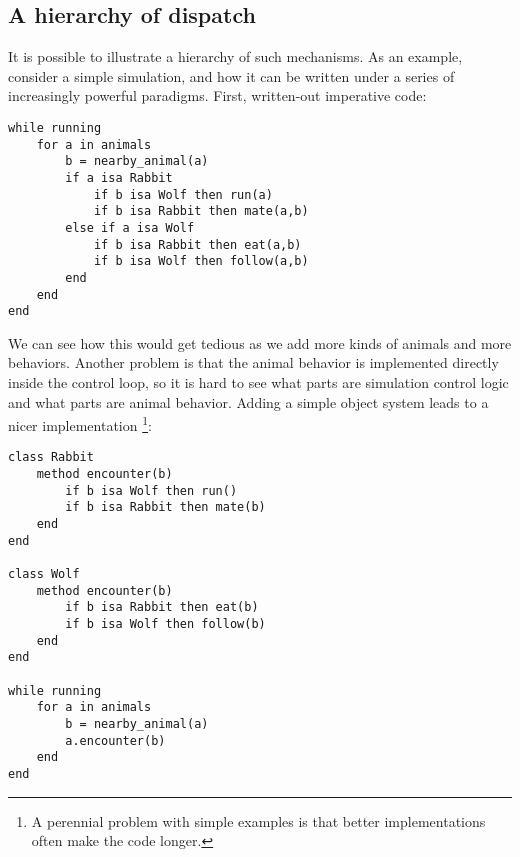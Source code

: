 

\subsection{A hierarchy of dispatch}

It is possible to illustrate a hierarchy of such mechanisms.
As an example, consider a simple simulation, and how it can be written
under a series of increasingly powerful paradigms. First, written-out
imperative code:

\vspace{-3ex}
\begin{singlespace}
\begin{verbatim}
while running
    for a in animals
        b = nearby_animal(a)
        if a isa Rabbit
            if b isa Wolf then run(a)
            if b isa Rabbit then mate(a,b)
        else if a isa Wolf
            if b isa Rabbit then eat(a,b)
            if b isa Wolf then follow(a,b)
        end
    end
end
\end{verbatim}
\end{singlespace}

We can see how this would get tedious as we add more kinds of animals
and more behaviors.
Another problem is that the animal behavior is
implemented directly inside the control loop, so it is hard to see
what parts are simulation control logic and what parts are animal
behavior.
Adding a simple object system leads to a nicer implementation
\footnote{A perennial problem with simple examples is that better
implementations often make the code longer.}:

\vspace{-3ex}
\begin{singlespace}
\begin{verbatim}
class Rabbit
    method encounter(b)
        if b isa Wolf then run()
        if b isa Rabbit then mate(b)
    end
end

class Wolf
    method encounter(b)
        if b isa Rabbit then eat(b)
        if b isa Wolf then follow(b)
    end
end

while running
    for a in animals
        b = nearby_animal(a)
        a.encounter(b)
    end
end
\end{verbatim}
\end{singlespace}

